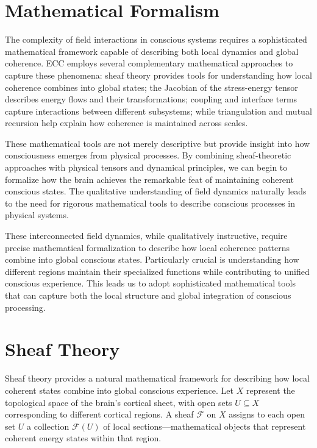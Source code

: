 \begin{refsection}
\section{Mathematical Formalism}

The complexity of field interactions in conscious systems requires a sophisticated mathematical framework capable of describing both local dynamics and global coherence. ECC employs several complementary mathematical approaches to capture these phenomena: sheaf theory provides tools for understanding how local coherence combines into global states; the Jacobian of the stress-energy tensor describes energy flows and their transformations; coupling and interface terms capture interactions between different subsystems; while triangulation and mutual recursion help explain how coherence is maintained across scales.

These mathematical tools are not merely descriptive but provide insight into how consciousness emerges from physical processes. By combining sheaf-theoretic approaches with physical tensors and dynamical principles, we can begin to formalize how the brain achieves the remarkable feat of maintaining coherent conscious states. The qualitative understanding of field dynamics naturally leads to the need for rigorous mathematical tools to describe conscious processes in physical systems.

These interconnected field dynamics, while qualitatively instructive, require precise mathematical formalization to describe how local coherence patterns combine into global conscious states. Particularly crucial is understanding how different regions maintain their specialized functions while contributing to unified conscious experience. This leads us to adopt sophisticated mathematical tools that can capture both the local structure and global integration of conscious processing.

\section{Sheaf Theory}

Sheaf theory provides a natural mathematical framework for describing how local coherent states combine into global conscious experience. Let $X$ represent the topological space of the brain's cortical sheet, with open sets $U \subseteq X$ corresponding to different cortical regions. A sheaf $\mathcal{F}$ on $X$ assigns to each open set $U$ a collection $\mathcal{F}(U)$ of local sections—mathematical objects that represent coherent energy states within that region.


\end{refsection}
